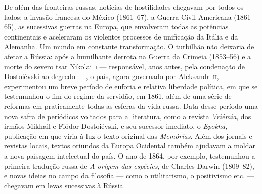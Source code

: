 De além das fronteiras russas, notícias de hostilidades chegavam por todos os
lados: a invasão francesa do México (1861--67), a Guerra Civil Americana
(1861--65), as sucessivas guerras na Europa, que envolveram todas as potências
continentais e aceleraram os violentos processos de unificação da Itália e da
Alemanha. Um mundo em constante transformação. O turbilhão não deixaria de
afetar a Rússia: após a humilhante derrota na Guerra da Crimeia (1853--56) e a
morte do severo tsar Nikolai~\textsc{i} --- responsável, anos antes, pela condenação de
Dostoiévski ao degredo~---, o país, agora governado por Aleksandr~\textsc{ii},
experimentou um breve período de euforia e relativa liberdade política, em que
se testemunhou o fim do regime da servidão, em 1861, além de uma série de
reformas em praticamente todas as esferas da vida russa. Data desse período uma
nova safra de periódicos voltados para a literatura, como a revista
\textit{Vriêmia}, dos irmãos Mikhail e Fiódor Dostoiévski, e seu sucessor
imediato, o \textit{Epokha}, publicação em que viria à luz o texto original das
\textit{Memórias}. Além dos jornais e revistas locais, textos oriundos da
Europa Ocidental também ajudavam a moldar a nova paisagem intelectual do país.
O ano de 1864, por exemplo, testemunhou a primeira tradução russa de \textit{A
origem das espécies}, de Charles Darwin (1809--82), e novas ideias no campo da
filosofia --- como o utilitarismo, o positivismo etc. --- chegavam em levas sucessivas à Rússia.

